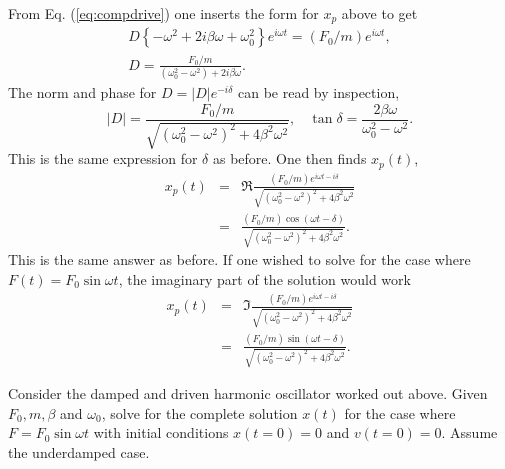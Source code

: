 From Eq. (\ref{eq:compdrive}) one inserts the form for $x_p$ above to get
\begin{eqnarray}
D\left\{-\omega^2+2i\beta\omega+\omega_0^2\right\}e^{i\omega t}=(F_0/m)e^{i\omega t},\\
\nonumber
D=\frac{F_0/m}{(\omega_0^2-\omega^2)+2i\beta\omega}.
\end{eqnarray}
The norm and phase for $D=|D|e^{-i\delta}$ can be read by inspection,
\begin{equation}
|D|=\frac{F_0/m}{\sqrt{(\omega_0^2-\omega^2)^2+4\beta^2\omega^2}},~~~~\tan\delta=\frac{2\beta\omega}{\omega_0^2-\omega^2}.
\end{equation}
This is the same expression for $\delta$ as before. One then finds $x_p(t)$,
\begin{eqnarray}
\label{eq:fastdriven1}
x_p(t)&=&\Re\frac{(F_0/m)e^{i\omega t-i\delta}}{\sqrt{(\omega_0^2-\omega^2)^2+4\beta^2\omega^2}}\\
\nonumber
&=&\frac{(F_0/m)\cos(\omega t-\delta)}{\sqrt{(\omega_0^2-\omega^2)^2+4\beta^2\omega^2}}.
\end{eqnarray}
This is the same answer as before.
If one wished to solve for the case where $F(t)= F_0\sin\omega t$, the imaginary part of the solution would work
\begin{eqnarray}
\label{eq:fastdriven2}
x_p(t)&=&\Im\frac{(F_0/m)e^{i\omega t-i\delta}}{\sqrt{(\omega_0^2-\omega^2)^2+4\beta^2\omega^2}}\\
\nonumber
&=&\frac{(F_0/m)\sin(\omega t-\delta)}{\sqrt{(\omega_0^2-\omega^2)^2+4\beta^2\omega^2}}.
\end{eqnarray}

\example
Consider the damped and driven harmonic oscillator worked out above. Given $F_0, m,\beta$ and $\omega_0$, solve for the complete solution $x(t)$ for the case where $F=F_0\sin\omega t$ with initial conditions $x(t=0)=0$ and $v(t=0)=0$. Assume the underdamped case.

